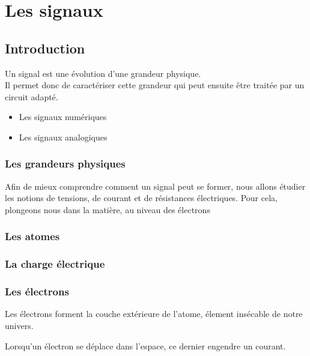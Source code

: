 
\chapter{Les signaux}

\section{Introduction}

Un signal est une évolution d'une grandeur physique.\\
Il permet donc de caractériser cette grandeur qui peut ensuite être traitée par un circuit adapté.


\begin{itemize}
    \item Les signaux numériques
    \item Les signaux analogiques
\end{itemize} 

\subsection{Les grandeurs physiques}

Afin de mieux comprendre comment un signal peut se former, nous allons étudier les notions de tensions, de courant et de résistances électriques.
Pour cela, plongeons nous dans la matière, au niveau des électrons

\subsection{Les atomes}

\subsection{La charge électrique}


\subsection{Les électrons}

Les électrons forment la couche extérieure de l'atome, élement insécable de notre univers.


Lorsqu'un électron se déplace dans l'espace, ce dernier engendre un courant.



